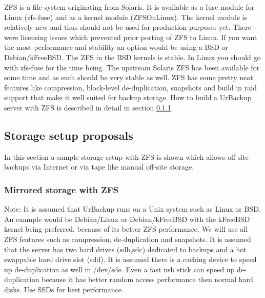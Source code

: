 \documentclass[a4paper,10pt]{article} \usepackage[breaklinks=true]{hyperref}
\begin{document}
ZFS is a file system originating from Solaris. It is available as a fuse module for Linux (zfs-fuse) and as a kernel module (ZFSOnLinux). The kernel module is relatively new and thus should not be used for production purposes yet. There were licensing issues which prevented prior porting of ZFS to Linux. If you want the most performance and stability an option would be using a BSD or Debian/kFreeBSD. The ZFS in the BSD kernels is stable. In Linux you should go with zfs-fuse for the time being. The upstream Solaris ZFS has been available for some time and as such should be very stable as well. ZFS has some pretty neat features like compression, block-level de-duplication, snapshots and build in raid support that make it well suited for backup storage. How to build a UrBackup server with ZFS is described in detail in section \ref{subsec_ZFS_setup}.


\subsection{Storage setup proposals}
\label{sec_storage_proposals}

In this section a sample storage setup with ZFS is shown which allows off-site backups via Internet or via tape like manual off-site storage.

\subsubsection{Mirrored storage with ZFS}
\label{subsec_ZFS_setup}

Note: It is assumed that UrBackup runs on a Unix system such as Linux or BSD. An example would be Debian/Linux or Debian/kFreeBSD with the kFreeBSD kernel being preferred, because of its better ZFS performance. We will use all ZFS features such as compression, de-duplication and snapshots. It is assumed that the server has two hard drives (sdb,sdc) dedicated to backups and a hot swappable hard drive slot (sdd). It is assumed there is a caching device to speed up de-duplication as well in /dev/sde. Even a fast usb stick can speed up de-duplication because it has better random access performance then normal hard disks. Use SSDs for best performance. 
\end{document}
